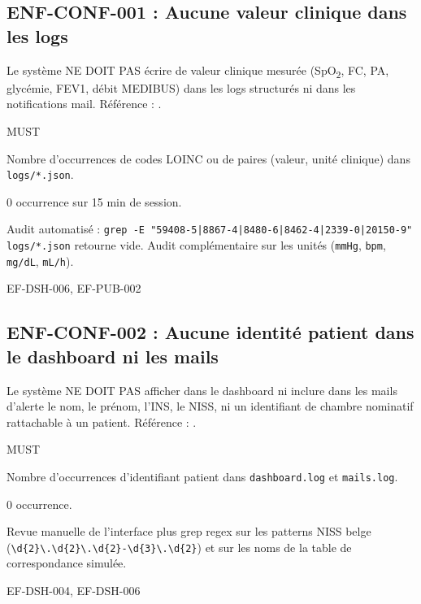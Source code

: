 \subsection*{ENF-CONF-001 : Aucune valeur clinique dans les logs}
\begin{description}[leftmargin=2.5cm, style=nextline]
  \item[Énoncé] Le système NE DOIT PAS écrire de valeur clinique mesurée (SpO\textsubscript{2}, FC, PA, glycémie, FEV1, débit MEDIBUS) dans les logs structurés ni dans les notifications mail. Référence : \cite{rgpd_2016_679}.
  \item[Priorité] MUST
  \item[Métrique] Nombre d'occurrences de codes LOINC ou de paires (valeur, unité clinique) dans \texttt{logs/*.json}.
  \item[Cible] 0 occurrence sur 15 min de session.
  \item[Mesure] Audit automatisé : \texttt{grep -E "59408-5|8867-4|8480-6|8462-4|2339-0|20150-9" logs/*.json} retourne vide. Audit complémentaire sur les unités (\texttt{mmHg}, \texttt{bpm}, \texttt{mg/dL}, \texttt{mL/h}).
  \item[Lié à] EF-DSH-006, EF-PUB-002
\end{description}

\subsection*{ENF-CONF-002 : Aucune identité patient dans le dashboard ni les mails}
\begin{description}[leftmargin=2.5cm, style=nextline]
  \item[Énoncé] Le système NE DOIT PAS afficher dans le dashboard ni inclure dans les mails d'alerte le nom, le prénom, l'INS, le NISS, ni un identifiant de chambre nominatif rattachable à un patient. Référence : \cite{rgpd_2016_679}.
  \item[Priorité] MUST
  \item[Métrique] Nombre d'occurrences d'identifiant patient dans \texttt{dashboard.log} et \texttt{mails.log}.
  \item[Cible] 0 occurrence.
  \item[Mesure] Revue manuelle de l'interface plus grep regex sur les patterns NISS belge (\texttt{\textbackslash d\{2\}\textbackslash .\textbackslash d\{2\}\textbackslash .\textbackslash d\{2\}-\textbackslash d\{3\}\textbackslash .\textbackslash d\{2\}}) et sur les noms de la table de correspondance simulée.
  \item[Lié à] EF-DSH-004, EF-DSH-006
\end{description}

